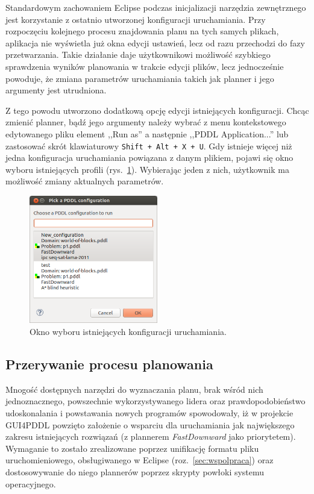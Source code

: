 Standardowym zachowaniem Eclipse podczas inicjalizacji narzędzia zewnętrznego jest korzystanie z ostatnio utworzonej konfiguracji uruchamiania. Przy rozpoczęciu kolejnego procesu znajdowania planu na tych samych plikach, aplikacja nie wyświetla już okna edycji ustawień, lecz od razu przechodzi do fazy przetwarzania. Takie działanie daje użytkownikowi możliwość szybkiego sprawdzenia wyników planowania w trakcie edycji plików, lecz jednocześnie powoduje, że zmiana parametrów uruchamiania takich jak planner i jego argumenty jest utrudniona.

Z tego powodu utworzono dodatkową opcję edycji istniejących konfiguracji. Chcąc zmienić planner, bądź jego argumenty należy wybrać z menu kontekstowego edytowanego pliku element ,,Run as'' a następnie ,,PDDL Application...'' lub zastosować skrót klawiaturowy \texttt{Shift~+~Alt~+~X~+~U}. Gdy istnieje więcej niż jedna konfiguracja uruchamiania powiązana z danym plikiem, pojawi się okno wyboru istniejących profili (rys.~\ref{fig:run_configuration_choice}). Wybierając jeden z nich, użytkownik ma możliwość zmiany aktualnych parametrów.

\begin{figure}[h!]
    \centering
    \includegraphics[width=0.5\textwidth]{img/run_configuration_choice}
    \caption{Okno wyboru istniejących konfiguracji uruchamiania.}
    \label{fig:run_configuration_choice}
\end{figure}

\subsection{Przerywanie procesu planowania}
\label{subsec:przerywanie}

Mnogość dostępnych narzędzi do wyznaczania planu, brak wśród nich jednoznacznego, powszechnie wykorzystywanego lidera oraz prawdopodobieństwo udoskonalania i powstawania nowych programów spowodowały, iż w projekcie GUI4PDDL powzięto założenie o wsparciu dla uruchamiania jak największego zakresu istniejących rozwiązań (z plannerem \textit{FastDownward} jako priorytetem). Wymaganie to zostało zrealizowane poprzez unifikację formatu pliku uruchomieniowego, obsługiwanego w Eclipse (roz.~\ref{sec:wspolpraca}) oraz dostosowywanie do niego plannerów poprzez skrypty powłoki systemu operacyjnego.

